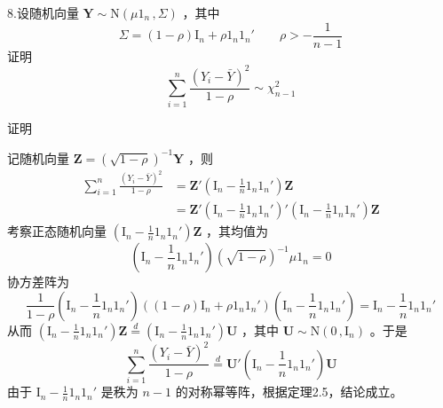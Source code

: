 \documentclass[12pt,hyperref,]{ctexart}
\begin{document}
\vspace{3em}

\kaishu

8.设随机向量 \(\boldsymbol{Y}\sim\mathrm{N}(\mu1_n\, ,\Sigma)\) ，其中
\begin{equation*}
\Sigma=(1-\rho)\mathrm{I}_n+\rho1_n1_n' \qquad \rho>-\frac{1}{n-1}
\end{equation*}证明 \begin{equation*}
\sum_{i=1}^n\frac{(Y_i-\bar{Y})^2}{1-\rho}\sim \chi_{n-1}^2
\end{equation*}

\vspace{1em}

\heiti

证明

\songti

记随机向量
\(\boldsymbol{Z}=\left(\sqrt{1-\rho}\right)^{-1}\boldsymbol{Y}\) ，则
\begin{equation*}
\begin{aligned}
\sum_{i=1}^n\frac{(Y_i-\bar{Y})^2}{1-\rho} &= \boldsymbol{Z}'\left(\mathrm{I}_n-\frac 1n1_n1_n'\right)\boldsymbol{Z} \\
&= \boldsymbol{Z}'\left(\mathrm{I}_n-\frac 1n1_n1_n'\right)'\left(\mathrm{I}_n-\frac 1n1_n1_n'\right)\boldsymbol{Z}
\end{aligned}
\end{equation*}考察正态随机向量
\(\left(\mathrm{I}_n-\frac 1n1_n1_n'\right)\boldsymbol{Z}\) ，其均值为
\begin{equation*}
\left(\mathrm{I}_n-\frac 1n1_n1_n'\right)\left(\sqrt{1-\rho}\right)^{-1}\mu 1_n=0
\end{equation*}协方差阵为 \begin{equation*}
\frac{1}{1-\rho}\left(\mathrm{I}_n-\frac 1n1_n1_n'\right)\left((1-\rho)\mathrm{I}_n+\rho1_n1_n'\right)\left(\mathrm{I}_n-\frac 1n1_n1_n'\right) = \mathrm{I}_n-\frac 1n1_n1_n'
\end{equation*}从而
\(\left(\mathrm{I}_n-\frac 1n1_n1_n'\right)\boldsymbol{Z}\overset{d}{=}\left(\mathrm{I}_n-\frac 1n1_n1_n'\right)\boldsymbol{U}\)
，其中 \(\boldsymbol{U}\sim\mathrm{N}(0\, ,\mathrm{I}_n)\) 。于是
\begin{equation*}
\sum_{i=1}^n\frac{(Y_i-\bar{Y})^2}{1-\rho} \overset{d}{=} \boldsymbol{U}'\left(\mathrm{I}_n-\frac 1n1_n1_n'\right)\boldsymbol{U}
\end{equation*}由于 \(\mathrm{I}_n-\frac 1n1_n1_n'\) 是秩为 \(n-1\)
的对称幂等阵，根据定理2.5，结论成立。

\vspace{3em}
\end{document}
